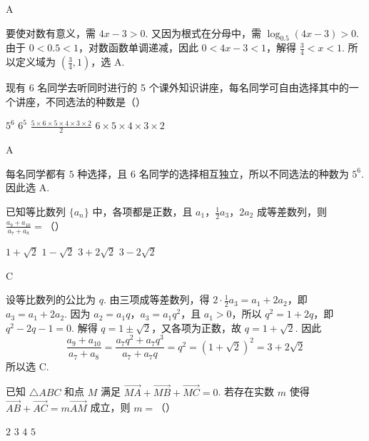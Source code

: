 \begin{answer}
A
\end{answer}

\begin{solution}
要使对数有意义，需 \(4x-3>0\). 又因为根式在分母中，需 \(\log_{0.5}(4x-3)>0\). 由于 \(0<0.5<1\)，对数函数单调递减，因此 \(0<4x-3<1\)，解得 \(\frac{3}{4}<x<1\). 所以定义域为 \(\left(\frac{3}{4},1\right)\)，选 A.
\end{solution}

\begin{problem}
现有 6 名同学去听同时进行的 5 个课外知识讲座，每名同学可自由选择其中的一个讲座，不同选法的种数是（\quad）

\choices
    {\(5^{6}\)}
    {\(6^{5}\)}
    {\(\frac{5\times 6\times 5\times 4\times 3\times 2}{2}\)}
    {\(6 \times 5 \times 4 \times 3 \times 2\)}
\end{problem}

\begin{answer}
A
\end{answer}

\begin{solution}
每名同学都有 \(5\) 种选择，且 \(6\) 名同学的选择相互独立，所以不同选法的种数为 \(5^6\). 因此选 A.
\end{solution}

\begin{problem}
已知等比数列 \( \{a_{n}\} \) 中，各项都是正数，且 \(a_{1}\)，\(\frac{1}{2}a_{3}\)，\(2a_{2}\) 成等差数列，则 \( \frac{a_{9} + a_{10}}{a_{7} + a_{8}} = \)（\quad）

\choices
    {\(1 + \sqrt{2}\)}
    {\(1 - \sqrt{2}\)}
    {\(3 + 2\sqrt{2}\)}
    {\(3 - 2\sqrt{2}\)}
\end{problem}

\begin{answer}
C
\end{answer}

\begin{solution}
设等比数列的公比为 \(q\). 由三项成等差数列，得 \(2\cdot\frac{1}{2}a_3=a_1+2a_2\)，即 \(a_3=a_1+2a_2\). 因为 \(a_2=a_1q\)，\(a_3=a_1q^2\)，且 \(a_1>0\)，所以 \(q^2=1+2q\)，即 \(q^2-2q-1=0\). 解得 \(q=1\pm\sqrt{2}\)，又各项为正数，故 \(q=1+\sqrt{2}\). 因此
\[
\frac{a_9+a_{10}}{a_7+a_8}
=\frac{a_7q^2+a_7q^3}{a_7+a_7q}
=q^2
=(1+\sqrt{2})^2
=3+2\sqrt{2}
\]
所以选 C.
\end{solution}

\begin{problem}
已知 \(\triangle ABC\) 和点 \(M\) 满足 \(\overrightarrow{MA} + \overrightarrow{MB} + \overrightarrow{MC} = 0\). 若存在实数 \(m\) 使得 \(\overrightarrow{AB} + \overrightarrow{AC} = m\overrightarrow{AM}\) 成立，则 \(m =\)（\quad）

\choices
    {\(2\)}
    {\(3\)}
    {\(4\)}
    {\(5\)}
\end{problem}

